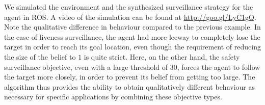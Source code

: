 We simulated the environment and the synthesized surveillance strategy for the agent in ROS. A video of the simulation can be found at \url{http://goo.gl/LyC1gQ}. Note the qualitative difference in behaviour compared to the previous example. In the case of liveness surveillance, the agent had more leeway to completely lose the target in order to reach its goal location, even though the requirement of reducing the size of the belief to $1$ is quite strict. Here, on the other hand, the safety surveillance objective, even with a large threshold of $30$, forces the agent to follow the target more closely, in order to prevent its belief from getting too large. The algorithm thus provides the ability to obtain qualitatively different behaviour as necessary for specific applications by combining these objective types. 


